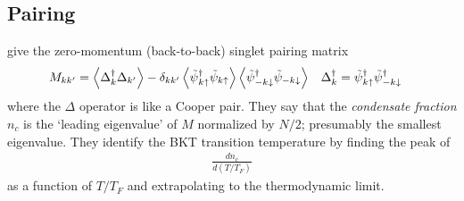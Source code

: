 \subsection{Pairing}\label{sec:pairing}

 give the zero-momentum (back-to-back) singlet pairing matrix
\begin{align}
	M_{kk'} &=
	\left\langle \Delta{}^{\dagger}_k \Delta_{k'} \right\rangle
	-	\delta_{kk'}
		\left\langle \tilde{\psi}{}^{\dagger}_{k\uparrow} \tilde{\psi}_{k\uparrow} \right\rangle
		\left\langle \tilde{\psi}{}^{\dagger}_{-k\downarrow} \tilde{\psi}_{-k\downarrow} \right\rangle
	&
	\Delta{}^{\dagger}_k &= \tilde{\psi}{}^{\dagger}_{k\uparrow} \tilde{\psi}{}^{\dagger}_{-k\downarrow}
\end{align}
where the $\Delta$ operator is like a Cooper pair.
They say that the \emph{condensate fraction} $n_c$ is the `leading eigenvalue' of $M$ normalized by $N/2$; presumably the smallest eigenvalue.
They identify the BKT transition temperature by finding the peak of
\begin{align}
	\frac{d n_c}{d(T/T_F)}
\end{align}
as a function of $T/T_F$ and extrapolating to the thermodynamic limit.
